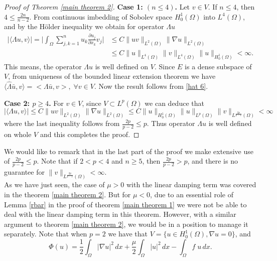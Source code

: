 \documentclass[reqno]{amsart}
\begin{document}
\begin{proof}[Proof of Theorem \ref{main theorem 2}]
\noindent\textbf{Case 1: \((n\leq 4)\).} Let \(v\in V\). If \( n \leq 4\), then
\( 4 \leq\frac{2n}{n-2}\). From  continuous imbedding of Sobolev space
\(H_0^1(\Omega)\)   into \(L^4(\Omega)\), and by the H\"{o}lder inequality
we obtain for operator \(\Lambda u\)
\begin{align*}
  |\langle\Lambda u, v\rangle|
  =\big|\int_\Omega\sum_{j,k=1}^n u_k\frac{\partial u_j}{\partial x_k}v_j\big|
  &\leq  C\rVert u v\rVert_{L^2(\Omega)}\rVert \nabla u \rVert_{L^2(\Omega)}\\
  &\leq  C\rVert u \rVert_{L^4(\Omega)}\rVert v\rVert_{L^4(\Omega)}
  \rVert  u \rVert_{H_0^1(\Omega)}< \infty.
\end{align*}
This means, the operator \(\Lambda u\) is well defined on \(V\).
Since \( E\) is a dense subspace of \(V \), from uniqueness of the bounded linear
extension theorem we have \(
\langle \hat{\Lambda} \bar{u},v\rangle=<\Lambda \bar{u},v>,\; \forall v\in V.
\)
Now the result follows from \eqref{hat 6}.
\smallskip

\noindent\textbf{Case 2: \(p\geq 4\).}
 For \(v\in V\), since \(V\subset L^p(\Omega)\)  we can deduce that
\[
  |\langle\Lambda u, v\rangle|
  \leq  C\rVert u v\rVert_{L^2(\Omega)}\rVert \nabla u \rVert_{L^2(\Omega)}
  \leq  C\rVert u \rVert_{H_0^1(\Omega)} \rVert u \rVert_{L^p(\Omega)}
  \rVert v \rVert_{L^{\frac{2p}{p-2}}(\Omega)}<\infty
\]
where the last inequality follows from
\( \frac{2p}{p-2}\leq p\). Thus operator \(\Lambda u\) is well defined on whole
\(V\) and this completes the proof.
\end{proof}

We would like to remark that in the last part of the proof we make extensive use of \( \frac{2p}{p-2}\leq p\). Note that if \(2<p<4\) and \(n\geq 5\), then \(\frac{2p}{p-2}>p\), and there is no guarantee for
\(\rVert v\rVert_{L^{\frac{2p}{p-2}}(\Omega)}<\infty\).\\

As we have just seen, the case of $\mu>0$ with the linear damping term was covered
in the  theorem \ref{main theorem 2}. But for $\mu<0$, due to  an essential role of
Lemma \ref{rbar} in the proof of theorem \ref{main theorem 1} we were not  be able to
deal with the linear damping term in this theorem. However, with a similar argument to
theorem \ref{main theorem 2}, we would be in a position to manage it separately.
Note that when $p=2$ we have that \( V = \{ u\in H_0^1(\Omega),\nabla u=0\} \), and
\[
\Phi(u)= \frac{1}{2}\int_{\Omega} |\nabla u|^2\,dx
+\frac{\mu}{2}\int_\Omega   |u|^{2}\,dx -\int_{\Omega} f\;u\,dx.
\]
\end{document}
